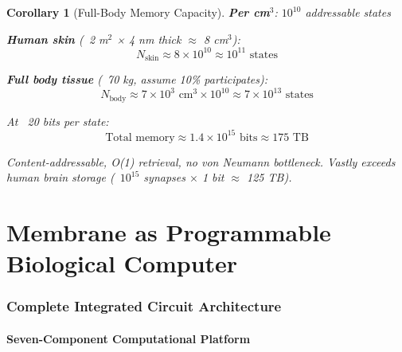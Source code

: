 \documentclass[11pt,a4paper]{article}
\newtheorem{corollary}[theorem]{Corollary}
\theoremstyle{definition}
\theoremstyle{remark}
\begin{document}
\begin{corollary}[Full-Body Memory Capacity]
\textbf{Per cm$^3$}: $10^{10}$ addressable states

\textbf{Human skin} (~2 m$^2$ × 4 nm thick $\approx$ 8 cm$^3$):
\begin{equation}
N_{\text{skin}} \approx 8 \times 10^{10} \approx 10^{11} \text{ states}
\end{equation}

\textbf{Full body tissue} (~70 kg, assume 10\% participates):
\begin{equation}
N_{\text{body}} \approx 7 \times 10^3 \text{ cm}^3 \times 10^{10} \approx 7 \times 10^{13} \text{ states}
\end{equation}

At ~20 bits per state:
\begin{equation}
\text{Total memory} \approx 1.4 \times 10^{15} \text{ bits} \approx 175 \text{ TB}
\end{equation}

Content-addressable, O(1) retrieval, no von Neumann bottleneck. Vastly exceeds human brain storage (~$10^{15}$ synapses $\times$ 1 bit $\approx$ 125 TB).
\end{corollary}

\part{Membrane as Programmable Biological Computer}

\section{Complete Integrated Circuit Architecture}

\subsection{Seven-Component Computational Platform}
\end{document}
